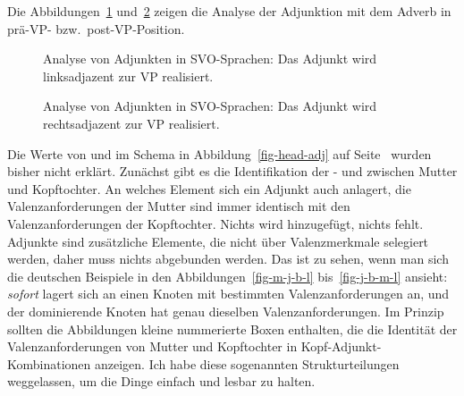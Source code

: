 Die Abbildungen~\ref{fig-adj-vp} und~\ref{fig-vp-adj} zeigen die Analyse der Adjunktion mit dem Adverb in
prä-VP- bzw.\ post-VP-Position.
\begin{figure}
\caption{\label{fig-adj-vp}Analyse von Adjunkten in SVO-Sprachen: Das Adjunkt wird linksadjazent zur VP realisiert.}
\end{figure}
\begin{figure}
\caption{\label{fig-vp-adj}Analyse von Adjunkten in SVO-Sprachen: Das Adjunkt wird rechtsadjazent zur VP realisiert.}
\end{figure}

Die Werte von \spr und \comps im Schema in Abbildung~\ref{fig-head-adj} auf
Seite~\pageref{fig-head-adj} wurden bisher nicht erklärt. Zunächst gibt es die Identifikation der \spr%
- und \compswe zwischen Mutter und Kopftochter. An welches Element sich ein Adjunkt auch anlagert, die Valenzanforderungen der Mutter sind immer identisch mit den Valenzanforderungen der
Kopftochter. Nichts wird hinzugefügt, nichts fehlt. Adjunkte sind zusätzliche Elemente, die nicht
über Valenzmerkmale selegiert werden, daher muss nichts abgebunden werden. Das ist zu sehen, wenn man sich
die deutschen Beispiele in den Abbildungen~\ref{fig-m-j-b-l} bis~\ref{fig-j-b-m-l} ansieht: \emph{sofort}
lagert sich an einen Knoten mit bestimmten Valenzanforderungen an, und der dominierende Knoten hat genau dieselben
Valenzanforderungen. Im Prinzip sollten die Abbildungen kleine nummerierte Boxen enthalten, die
die Identität der Valenzanforderungen von Mutter und Kopftochter in Kopf-Adjunkt-Kombinationen anzeigen. Ich habe
diese sogenannten Strukturteilungen weggelassen, um die Dinge einfach und lesbar zu halten.

